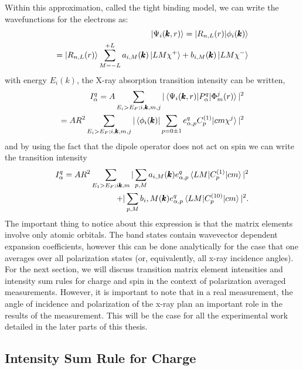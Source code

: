 Within this approximation, called the tight binding model, we can write the wavefunctions for the electrons as:
\begin{eqnarray}
\ket{\Psi_i(\pmb{k},r)}=\ket{R_{n,L}(r)|\phi_i(\pmb{k})} \\
= \ket{R_{n,L}(r)}\sum^{+L}_{M=-L}a_{i,M}(\pmb{k})\ket{LM\chi^+}+b_{i,M}(\pmb{k})\ket{LM\chi^-}
\end{eqnarray}
with energy $E_i(k)$, the X-ray absorption transition intensity can be written,
\begin{eqnarray}
I_\alpha^q = A\sum_{E_i>E_F; i ,\pmb{k}, m, j} |\braket{\Psi_i(\pmb{k},r)|P_\alpha^q|\Phi_m^j(r)}|^2 \\
= A R^2 \sum_{E_i>E_F;i,\pmb{k},m,j}|\braket{\phi_i(\pmb{k})|\sum_{p=0\pm 1}e^q_{\alpha,p}C_p^{(1)}|cm\chi^j}|^2
\end{eqnarray}
and by using the fact that the dipole operator does not act on spin we can write the transition intensity
\begin{equation}
\begin{split}
I_\alpha^q=AR^2\sum_{E_1>E_F; i\pmb{k},m}|\sum_{p,M}a_{i,M}(\pmb{k})e_{\alpha,p}^q\braket{LM|C_p^{(1)}|cm}|^2\\
+ |\sum_{p,M}b_i,M(\pmb{k})e^q_{\alpha,p}\braket{LM|C_p^{(10)}|cm}|^2.
\label{transI}
\end{split}
\end{equation}
The important thing to notice about this expression is that the matrix elements involve only atomic orbitals. The band states contain wavevector dependent expansion coefficients, however this can be done analytically for the case that one averages over all polarization states (or, equivalently, all x-ray incidence angles). For the next section, we will discuss transition matrix element intensities and intensity sum rules for charge and spin in the context of polarization averaged measurements. However, it is important to note that in a real measurement, the angle of incidence and polarization of the x-ray plan an important role in the results of the measurement. This will be the case for all the experimental work detailed in the later parts of this thesis. 

\subsection{Intensity Sum Rule for Charge}

